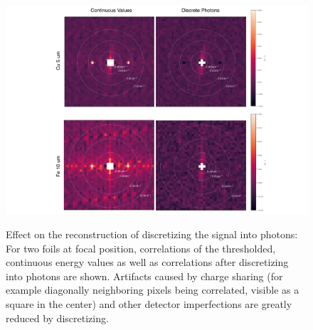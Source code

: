 \begin{figure}
	\includegraphics[width=\linewidth]{images/foil_photonmodes.pdf}
	\label{fig:foil_photonmodes}
	\caption[Effect of discretizing the signal into photons]{Effect on the reconstruction of discretizing the signal into photons: For two foils at focal position,  correlations of the thresholded, continuous energy values as well as correlations after discretizing into photons are shown. Artifacts caused by charge sharing (for example diagonally neighboring pixels being correlated, visible as a square in the center) and other detector imperfections are greatly reduced by discretizing.}
\end{figure}

